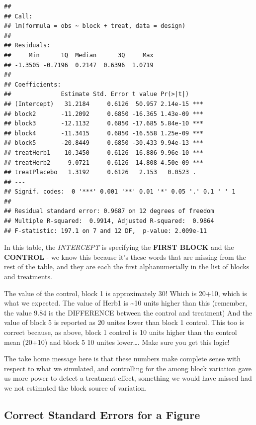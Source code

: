\documentclass[
]{book}
\begin{document}
\begin{verbatim}
## 
## Call:
## lm(formula = obs ~ block + treat, data = design)
## 
## Residuals:
##     Min      1Q  Median      3Q     Max 
## -1.3505 -0.7196  0.2147  0.6396  1.0719 
## 
## Coefficients:
##              Estimate Std. Error t value Pr(>|t|)    
## (Intercept)   31.2184     0.6126  50.957 2.14e-15 ***
## block2       -11.2092     0.6850 -16.365 1.43e-09 ***
## block3       -12.1132     0.6850 -17.685 5.84e-10 ***
## block4       -11.3415     0.6850 -16.558 1.25e-09 ***
## block5       -20.8449     0.6850 -30.433 9.94e-13 ***
## treatHerb1    10.3450     0.6126  16.886 9.96e-10 ***
## treatHerb2     9.0721     0.6126  14.808 4.50e-09 ***
## treatPlacebo   1.3192     0.6126   2.153   0.0523 .  
## ---
## Signif. codes:  0 '***' 0.001 '**' 0.01 '*' 0.05 '.' 0.1 ' ' 1
## 
## Residual standard error: 0.9687 on 12 degrees of freedom
## Multiple R-squared:  0.9914, Adjusted R-squared:  0.9864 
## F-statistic: 197.1 on 7 and 12 DF,  p-value: 2.009e-11
\end{verbatim}

In this table, the \emph{INTERCEPT} is specifying the \textbf{FIRST BLOCK} and the \textbf{CONTROL} - we know this because it's these words that are missing from the rest of the table, and they are each the first alphanumerially in the list of blocks and treatments.

The value of the control, block 1 is approximately 30! Which is 20+10, which is what we expected.
The value of Herb1 is \textasciitilde10 units higher than this (remember, the value 9.84 is the DIFFERENCE between the control and treatment)
And the value of block 5 is reported as 20 unites lower than block 1 control. This too is correct because, as above, block 1 control is 10 units higher than the control mean (20+10) and block 5 10 unites lower\ldots. Make sure you get this logic!

The take home message here is that these numbers make complete sense with respect to what we simulated, and controlling for the among block variation gave us more power to detect a treatment effect, something we would have missed had we not estimated the block source of variation.

\hypertarget{correct-standard-errors-for-a-figure}{%
\subsection{Correct Standard Errors for a Figure}\label{correct-standard-errors-for-a-figure}}
\end{document}
